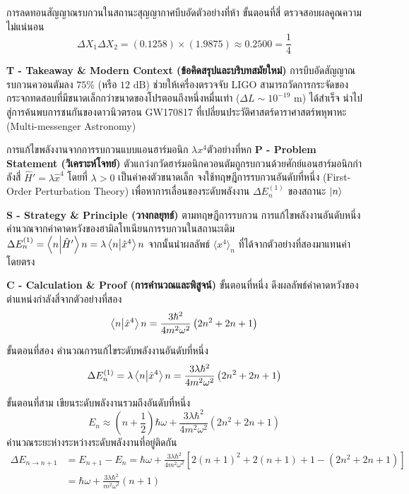 \begin{psctbox}{การลดทอนสัญญาณรบกวนในสถานะสุญญากาศบีบอัด}{ตัวอย่างที่ห้า}
ขั้นตอนที่สี่ ตรวจสอบผลคูณความไม่แน่นอน
\begin{equation}
\Delta X_1 \Delta X_2 = (0.1258) \times (1.9875) \approx 0.2500 = \frac{1}{4}
\end{equation}

\vspace{6pt}
\noindent\textbf{T - Takeaway \& Modern Context (ข้อคิดสรุปและบริบทสมัยใหม่)} การบีบอัดสัญญาณรบกวนควอนตัมลง $75\%$ (หรือ $12\text{ dB}$) ช่วยให้เครื่องตรวจจับ LIGO สามารถวัดการกระจัดของกระจกทดสอบที่มีขนาดเล็กกว่าขนาดของโปรตอนถึงหนึ่งหมื่นเท่า ($\Delta L \sim 10^{-19}\text{ m}$) ได้สำเร็จ นำไปสู่การค้นพบการชนกันของดาวนิวตรอน GW170817 ที่เปลี่ยนประวัติศาสตร์ดาราศาสตร์พหุพาหะ (Multi-messenger Astronomy)
\end{psctbox}

\begin{psctbox}{การแก้ไขพลังงานจากการรบกวนแบบแอนฮาร์มอนิก $\lambda x^4$}{ตัวอย่างที่หก}
\noindent\textbf{P - Problem Statement (วิเคราะห์โจทย์)} ตัวแกว่งกวัดฮาร์มอนิกควอนตัมถูกรบกวนด้วยศักย์แอนฮาร์มอนิกกำลังสี่ $\hat{H}' = \lambda \hat{x}^4$ โดยที่ $\lambda > 0$ เป็นค่าคงตัวขนาดเล็ก จงใช้ทฤษฎีการรบกวนอันดับที่หนึ่ง (First-Order Perturbation Theory) เพื่อหาการเลื่อนของระดับพลังงาน $\Delta E_n^{(1)}$ ของสถานะ $\ket{n}$

\vspace{6pt}
\noindent\textbf{S - Strategy \& Principle (วางกลยุทธ์)} ตามทฤษฎีการรบกวน การแก้ไขพลังงานอันดับหนึ่งคำนวณจากค่าคาดหวังของฮามิลโทเนียนการรบกวนในสถานะเดิม $\Delta E_n^{(1)} = \braket{n}{\hat{H}'}{n} = \lambda \braket{n}{\hat{x}^4}{n}$ จากนั้นนำผลลัพธ์ $\langle x^4 \rangle_n$ ที่ได้จากตัวอย่างที่สองมาแทนค่าโดยตรง

\vspace{6pt}
\noindent\textbf{C - Calculation \& Proof (การคำนวณและพิสูจน์)}
ขั้นตอนที่หนึ่ง ดึงผลลัพธ์ค่าคาดหวังของตำแหน่งกำลังสี่จากตัวอย่างที่สอง
\begin{equation}
\braket{n}{\hat{x}^4}{n} = \frac{3\hbar^2}{4m^2\omega^2}\left( 2n^2 + 2n + 1 \right)
\end{equation}

ขั้นตอนที่สอง คำนวณการแก้ไขระดับพลังงานอันดับที่หนึ่ง
\begin{equation}
\Delta E_n^{(1)} = \lambda \braket{n}{\hat{x}^4}{n} = \frac{3\lambda\hbar^2}{4m^2\omega^2}\left( 2n^2 + 2n + 1 \right)
\end{equation}

ขั้นตอนที่สาม เขียนระดับพลังงานรวมถึงอันดับที่หนึ่ง
\begin{equation}
E_n \approx \left(n + \frac{1}{2}\right)\hbar\omega + \frac{3\lambda\hbar^2}{4m^2\omega^2}\left( 2n^2 + 2n + 1 \right)
\end{equation}
คำนวณระยะห่างระหว่างระดับพลังงานที่อยู่ติดกัน
\begin{align}
\Delta E_{n \to n+1} &= E_{n+1} - E_n = \hbar\omega + \frac{3\lambda\hbar^2}{4m^2\omega^2}\left[ 2(n+1)^2 + 2(n+1) + 1 - (2n^2 + 2n + 1) \right] \nonumber \\
&= \hbar\omega + \frac{3\lambda\hbar^2}{m^2\omega^2}(n + 1)
\end{align}


\end{psctbox}
